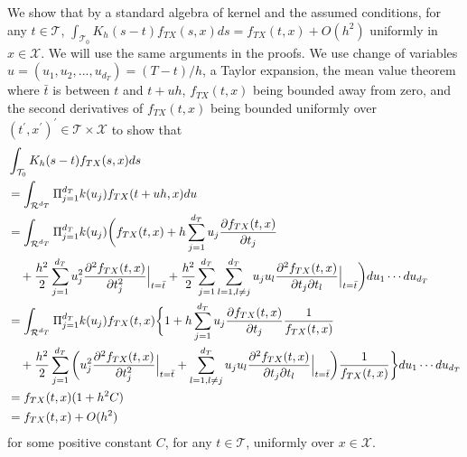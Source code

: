 \documentclass[lettersize, 12pt]{article}
\begin{document}
We show that by a standard algebra of kernel and the assumed conditions, 
for any $t\in\mathcal{T}$, 
$\int_{\mathcal{T}_0} K_h(s - t) f_{TX}(s,x)ds = f_{TX}(t, x) + O(h^2)$
uniformly in $x\in \mathcal{X}$.
We will use the same arguments in the proofs.
We use change of variables $u = (u_1, u_2,..., u_{d_T}) = (T-t)/h$,
a Taylor expansion, the mean value theorem where $\bar t$ is between $t$ and $t+uh$,
$f_{TX}(t,x)$ being bounded away from zero, 
and the second derivatives of $f_{TX}(t,x)$ being bounded uniformly over $(t^\prime,x^\prime)^\prime \in \mathcal{T}\times\mathcal{X}$ to show that \begin{align}
&\int_{\mathcal{T}_0} K_h(s - t) f_{TX}(s,x)ds 
\notag\\
&= 
\int_{\mathcal{R}^{d_T}} \Pi_{j=1}^{d_T}k(u_j) f_{TX}(t+uh,x)du 
\notag \\
&= 
\int_{\mathcal{R}^{d_T}} \Pi_{j=1}^{d_T}k(u_j) \bigg( f_{TX}(t,x) + h \sum_{j=1}^{d_T}u_j\frac{\partial f_{TX}(t,x) }{\partial t_j} \notag\\ 
&\ \ \ + \frac{h^2}{2} \sum_{j=1}^{d_T}u_j^2\frac{\partial^2 f_{TX}(t,x)}{\partial{t_j^2}}  \Big|_{t=\bar t}
+ \frac{h^2}{2}\sum_{j=1}^{d_T}\sum_{l=1, l\neq j}^{d_T}u_j u_l \frac{\partial^2  f_{TX}(t,x)}{\partial t_j \partial t_l}  \Big|_{t=\bar t}
 \bigg) du_1\cdots du_{d_T} \notag \\
&= 
\int_{\mathcal{R}^{d_T}} \Pi_{j=1}^{d_T}k(u_j) 
f_{TX}(t,x) \bigg\{ 1 + h \sum_{j=1}^{d_T}u_j\frac{\partial f_{TX}(t,x) }{\partial t_j}
\frac{1}{f_{TX}(t,x)}  \notag\\ 
&\ \ \ + \frac{h^2}{2} \sum_{j=1}^{d_T}\bigg(u_j^2 \frac{\partial^2 f_{TX}(t,x)}{\partial{t_j^2}}  \Big|_{t=\bar t}
+ \sum_{l=1, l\neq j}^{d_T}u_j u_l \frac{\partial^2  f_{TX}(t,x)}{\partial t_j \partial t_l}  \Big|_{t=\bar t}\bigg)\frac{1}{f_{TX}(t,x)} 
 \bigg\} du_1\cdots du_{d_T} \notag \\
&= f_{TX}(t, x) (1 + h^2 C)
\label{algebra}
\\
&= f_{TX}(t, x) + O(h^2)
\notag
\end{align}
for some positive constant $C$, for any $t\in\mathcal{T}$, uniformly over $x\in\mathcal{X}$.
\end{document}

